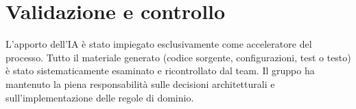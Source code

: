\section{Validazione e controllo}

L'apporto dell'IA è stato impiegato esclusivamente come acceleratore del processo. Tutto il materiale generato (codice sorgente, configurazioni, test o testo) è stato sistematicamente esaminato e ricontrollato dal team. Il gruppo ha mantenuto la piena responsabilità sulle decisioni architetturali e sull'implementazione delle regole di dominio.